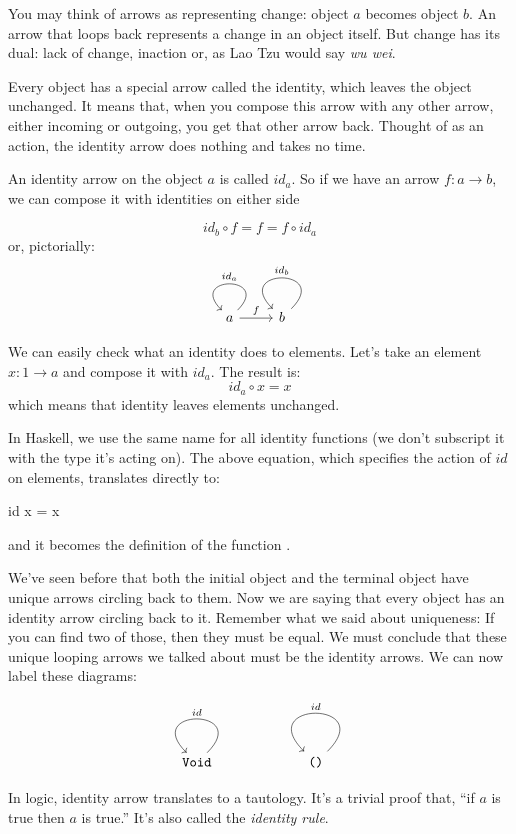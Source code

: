 \documentclass[DaoFP]{subfiles}
\begin{document}
You may think of arrows as representing change: object $a$ becomes object $b$. An arrow that loops back represents a change in an object itself. But change has its dual: lack of change, inaction or, as Lao Tzu would say \emph{wu wei}. 

Every object has a special arrow called the identity, which leaves the object unchanged. It means that, when you compose this arrow with any other arrow, either incoming or outgoing, you get that other arrow back. Thought of as an action, the identity arrow does nothing and takes no time.

An identity arrow on the object $a$ is called $id_a$. So if we have an arrow $f \colon a \to b$, we can compose it with identities on either side

\[id_b \circ f = f = f \circ id_a \]
or, pictorially:
\[
 \begin{tikzcd}
 a
 \arrow[loop, "id_a"']
 \arrow[r, "f"]
 & b
 \arrow[loop, "id_b"']
 \end{tikzcd}
\]

We can easily check what an identity does to elements. Let's take an element $x \colon 1 \to a$ and compose it with $id_a$. The result is:
\[id_a \circ x = x\]
which means that identity leaves elements unchanged.

In Haskell, we use the same name  for all identity functions (we don't subscript it with the type it's acting on). The above equation, which specifies the action of $id$ on elements, translates directly to:
\begin{haskell}
id x = x
\end{haskell}
and it becomes the definition of the function . 

We've seen before that both the initial object and the terminal object have unique arrows circling back to them. Now we are saying that every object has an identity arrow circling back to it. Remember what we said about uniqueness: If you can find two of those, then they must be equal. We must conclude that these unique looping arrows we talked about must be the identity arrows. We can now label these diagrams:

\[
 \begin{tikzcd}
 \hask{Void}
 \arrow[loop, "id"']
 \end{tikzcd}
 \begin{tikzcd}
 \hask{()}
 \arrow[loop, "id"']
 \end{tikzcd}
\]

In logic, identity arrow translates to a tautology. It's a trivial proof that, ``if $a$ is true then $a$ is true.'' It's also called the \emph{identity rule}.
\end{document}
